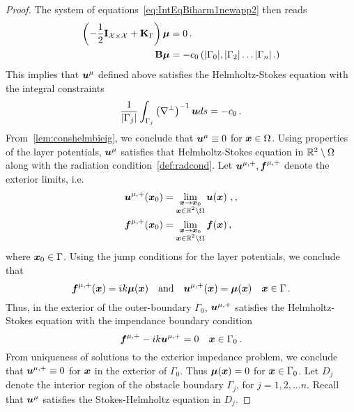 \begin{proof}
The system of equations~\cref{eq:IntEqBiharm1newapp2} then reads
\begin{align}
\left(-\frac{1}{2}\mathbf{I}_{\mathcal{X}\times\mathcal{X}} 
+ \mathbf{K}_\Gamma \right) 
\boldsymbol{\mu} &= 0 \, . \label{eq:IntEq1} \\
\mathbf{B} {\boldsymbol \mu} &= -c_{0} \left(|\Gamma_{0}|, |\Gamma_{2}| \ldots |\Gamma_{n}| 
\,. 
\right)
\end{align}
This implies that ${\boldsymbol u}^{\mu}$ defined above satisfies the
Helmholtz-Stokes equation with the integral constraints
\begin{equation}
\frac{1}{|\Gamma_{j}|} 
\int_{\Gamma_{j}} \left(\nabla^{\perp}\right)^{-1} {\boldsymbol u} ds = -c_{0} 
\, .
\end{equation}
From~\cref{lem:conshelmbieig}, we conclude that ${\boldsymbol u}^{\mu} \equiv 0$ 
for ${\boldsymbol x} \in \Omega$.
Using properties of the layer potentials, ${\boldsymbol u}^{\mu}$ satisfies that
Helmholtz-Stokes equation in $\mathbb{R}^{2} \setminus \Omega$
along with the radiation condition~\cref{def:radcond}.
Let ${\boldsymbol u}^{\mu,+}, {\boldsymbol f}^{\mu,+}$ denote the exterior limits, i.e.
\begin{align}
{\boldsymbol u}^{\mu,+}({\boldsymbol x}_{0}) &=
\lim_{\substack{{\boldsymbol x} \to {\boldsymbol x}_{0}\\ {\boldsymbol x} \in \mathbb{R}^{2} \setminus \Omega}}
{\boldsymbol u}({\boldsymbol x})\ , , \\ 
{\boldsymbol f}^{\mu,+}({\boldsymbol x}_{0}) &=
\lim_{\substack{{\boldsymbol x} \to {\boldsymbol x}_{0}\\ {\boldsymbol x} \in \mathbb{R}^{2} \setminus \Omega}}
{\boldsymbol f}({\boldsymbol x}) \, , \\ 
\end{align}
where ${\boldsymbol x}_{0} \in \Gamma$.
Using the jump conditions for the layer potentials, we conclude that
\begin{equation}
{\boldsymbol f}^{\mu,+}({\boldsymbol x}) = ik {\boldsymbol \mu} ({\boldsymbol x}) \quad \text{and} \quad 
{\boldsymbol u}^{\mu,+}({\boldsymbol x}) = {\boldsymbol \mu}
({\boldsymbol x}) \quad {\boldsymbol x} \in \Gamma \,. 
\label{eq:bcaux}
\end{equation}
Thus, in the exterior of the outer-boundary $\Gamma_{0}$, 
${\boldsymbol u}^{\mu,+}$ satisfies the Helmholtz-Stokes equation with the impendance
boundary condition
\begin{equation}
{\boldsymbol f}^{\mu,+} -ik {\boldsymbol u}^{\mu,+} = 0 \quad {\boldsymbol x} \in \Gamma_{0} \, .
\end{equation}
From uniqueness of solutions to the exterior impedance problem, we
conclude that ${\boldsymbol u}^{\mu,+}\equiv 0$ for ${\boldsymbol x}$ in the exterior of 
$\Gamma_{0}$.
Thus ${\boldsymbol \mu}({\boldsymbol x}) = 0$ for ${\boldsymbol x} \in \Gamma_{0}$.
Let $D_{j}$ denote the interior region of the obstacle boundary
$\Gamma_{j}$, for $j=1,2,\ldots n$. 
Recall that ${\boldsymbol u}^{\mu}$ satisfies the Stokes-Helmholtz equation in $D_{j}$.

\end{proof}
